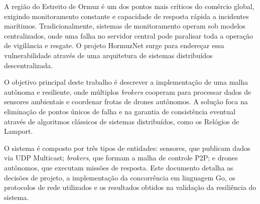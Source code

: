 A região do Estreito de Ormuz é um dos pontos mais críticos do comércio global, exigindo monitoramento constante e capacidade de resposta rápida a incidentes marítimos. Tradicionalmente, sistemas de monitoramento operam sob modelos centralizados, onde uma falha no servidor central pode paralisar toda a operação de vigilância e resgate. O projeto HormuzNet surge para endereçar essa vulnerabilidade através de uma arquitetura de sistemas distribuídos descentralizada.

O objetivo principal deste trabalho é descrever a implementação de uma malha autônoma e resiliente, onde múltiplos \textit{brokers} cooperam para processar dados de sensores ambientais e coordenar frotas de drones autônomos. A solução foca na eliminação de pontos únicos de falha e na garantia de consistência eventual através de algoritmos clássicos de sistemas distribuídos, como os Relógios de Lamport.

O sistema é composto por três tipos de entidades: sensores, que publicam dados via UDP Multicast; \textit{brokers}, que formam a malha de controle P2P; e drones autônomos, que executam missões de resposta. Este documento detalha as decisões de projeto, a implementação da concorrência em linguagem Go, os protocolos de rede utilizados e os resultados obtidos na validação da resiliência do sistema.
